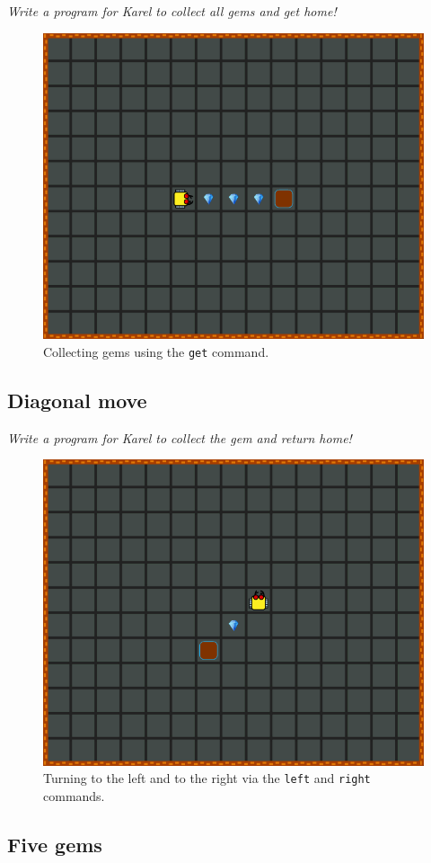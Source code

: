 {\em Write a program for Karel to collect all gems and get home! 

\begin{figure}[!ht]
\begin{center}
\includegraphics[height=0.4\textwidth]{img/b02.png}
\end{center}
\vspace{-4mm}
\caption{Collecting gems using the {\tt get} command.}
\label{fig:b02}
\vspace{-1cm}
\end{figure}
\newpage


\subsection{Diagonal move}

{\em Write a program for Karel to collect the gem and return home! 

\begin{figure}[!ht]
\begin{center}
\includegraphics[height=0.4\textwidth]{img/b03.png}
\end{center}
\vspace{-4mm}
\caption{Turning to the left and to the right via the {\tt left} and {\tt right} commands.}
\label{fig:b03}
\vspace{-1cm}
\end{figure}



\subsection{Five gems}

}}
